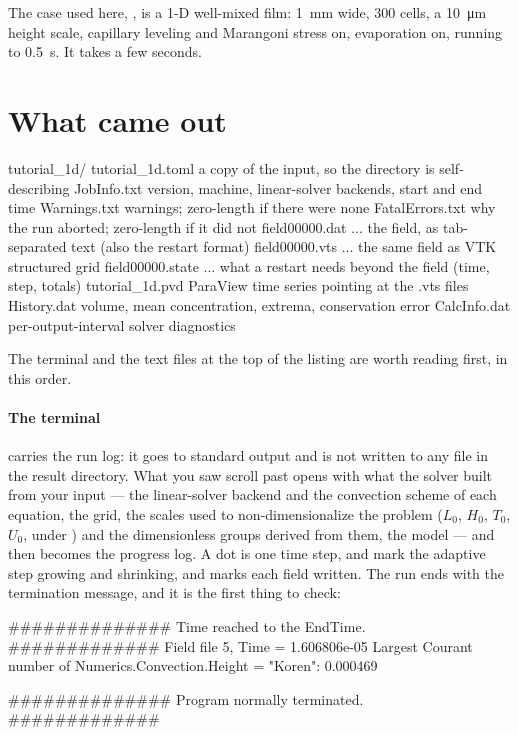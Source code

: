 The case used here, , is a 1-D well-mixed film:
\SI{1}{\milli\metre} wide, \SI{300}{} cells, a \SI{10}{\micro\metre} height
scale, capillary leveling and Marangoni stress on, evaporation on, running to
\SI{0.5}{\second}. It takes a few seconds.

\section{What came out}
\label{sec:firstrun:output}

\begin{plain}
tutorial_1d/
  tutorial_1d.toml        a copy of the input, so the directory is self-describing
  JobInfo.txt             version, machine, linear-solver backends, start and end time
  Warnings.txt            warnings; zero-length if there were none
  FatalErrors.txt         why the run aborted; zero-length if it did not
  field00000.dat ...      the field, as tab-separated text (also the restart format)
  field00000.vts ...      the same field as VTK structured grid
  field00000.state ...    what a restart needs beyond the field (time, step, totals)
  tutorial_1d.pvd         ParaView time series pointing at the .vts files
  History.dat             volume, mean concentration, extrema, conservation error
  CalcInfo.dat            per-output-interval solver diagnostics
\end{plain}

The terminal and the text files at the top of the listing are worth reading
first, in this order.

\paragraph{The terminal} carries the run log: it goes to standard output and is
not written to any file in the result directory. What you saw scroll past opens
with what the solver built from your input --- the linear-solver backend and
the convection scheme of each equation, the grid, the scales used to non-dimensionalize the
problem ($L_0$, $H_0$, $T_0$, $U_0$, under ) and the
dimensionless groups derived from them, the model --- and then becomes the
progress log. A
dot is one time step,  and  mark the adaptive step growing
and shrinking, and  marks each field
written. The run ends with the termination message, and it is the first thing
to check:

\begin{plain}
############## Time reached to the EndTime. #############
Field file 5, Time = 1.606806e-05
Largest Courant number of Numerics.Convection.Height = "Koren": 0.000469

############## Program normally terminated. #############
\end{plain}


